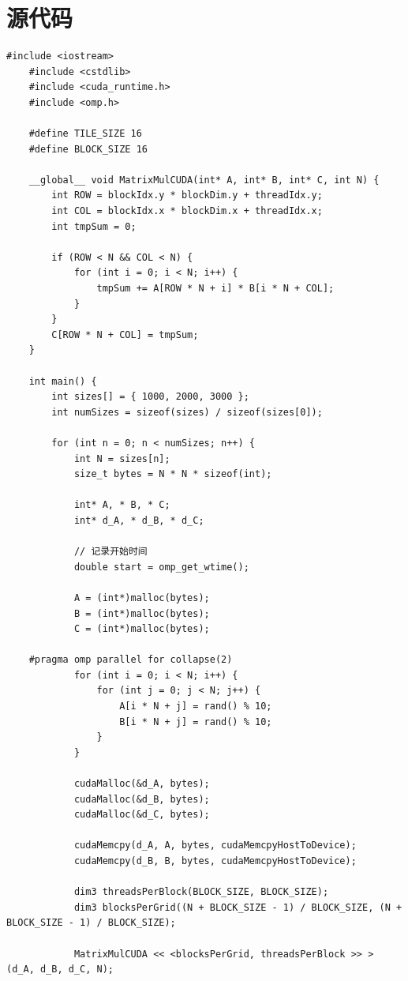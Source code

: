 \documentclass{article}
\begin{document}
\section{源代码}
\begin{lstlisting}[style=cstyle,caption={OpenMP和CUDA混合编程}]
    #include <iostream>
    #include <cstdlib>
    #include <cuda_runtime.h>
    #include <omp.h>
    
    #define TILE_SIZE 16
    #define BLOCK_SIZE 16
    
    __global__ void MatrixMulCUDA(int* A, int* B, int* C, int N) {
        int ROW = blockIdx.y * blockDim.y + threadIdx.y;
        int COL = blockIdx.x * blockDim.x + threadIdx.x;
        int tmpSum = 0;
    
        if (ROW < N && COL < N) {
            for (int i = 0; i < N; i++) {
                tmpSum += A[ROW * N + i] * B[i * N + COL];
            }
        }
        C[ROW * N + COL] = tmpSum;
    }
    
    int main() {
        int sizes[] = { 1000, 2000, 3000 };
        int numSizes = sizeof(sizes) / sizeof(sizes[0]);
    
        for (int n = 0; n < numSizes; n++) {
            int N = sizes[n];
            size_t bytes = N * N * sizeof(int);
    
            int* A, * B, * C;
            int* d_A, * d_B, * d_C;
    
            // 记录开始时间
            double start = omp_get_wtime();
    
            A = (int*)malloc(bytes);
            B = (int*)malloc(bytes);
            C = (int*)malloc(bytes);
    
    #pragma omp parallel for collapse(2)
            for (int i = 0; i < N; i++) {
                for (int j = 0; j < N; j++) {
                    A[i * N + j] = rand() % 10;
                    B[i * N + j] = rand() % 10;
                }
            }
    
            cudaMalloc(&d_A, bytes);
            cudaMalloc(&d_B, bytes);
            cudaMalloc(&d_C, bytes);
    
            cudaMemcpy(d_A, A, bytes, cudaMemcpyHostToDevice);
            cudaMemcpy(d_B, B, bytes, cudaMemcpyHostToDevice);
    
            dim3 threadsPerBlock(BLOCK_SIZE, BLOCK_SIZE);
            dim3 blocksPerGrid((N + BLOCK_SIZE - 1) / BLOCK_SIZE, (N + BLOCK_SIZE - 1) / BLOCK_SIZE);
    
            MatrixMulCUDA << <blocksPerGrid, threadsPerBlock >> > (d_A, d_B, d_C, N);
    

\end{lstlisting}
\end{document}
